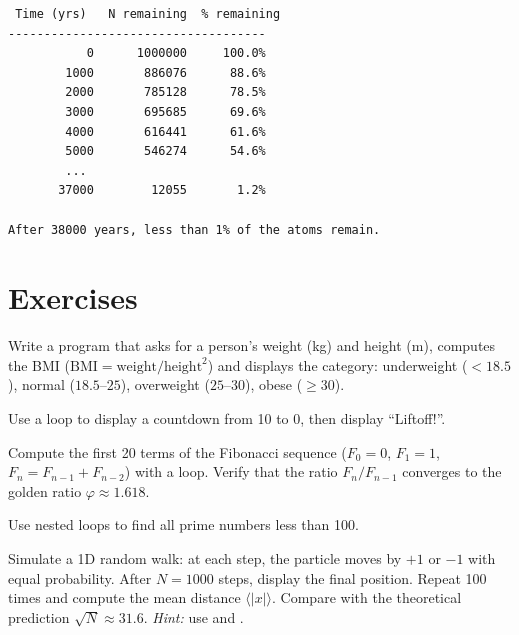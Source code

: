 \begin{codeoutput}
\begin{verbatim}
 Time (yrs)   N remaining  % remaining
------------------------------------
           0      1000000     100.0%
        1000       886076      88.6%
        2000       785128      78.5%
        3000       695685      69.6%
        4000       616441      61.6%
        5000       546274      54.6%
        ...
       37000        12055       1.2%

After 38000 years, less than 1% of the atoms remain.
\end{verbatim}
\end{codeoutput}

\section{Exercises}

\begin{exercise}
Write a program that asks for a person's weight (kg) and height (m),
computes the BMI ($\text{BMI} = \text{weight} / \text{height}^2$) and displays the
category: underweight ($<18.5$), normal ($18.5$--$25$), overweight ($25$--$30$),
obese ($\geq 30$).
\end{exercise}

\begin{exercise}
Use a  loop to display a countdown from 10 to 0,
then display ``Liftoff!''.
\end{exercise}

\begin{exercise}
Compute the first 20 terms of the Fibonacci sequence
($F_0 = 0$, $F_1 = 1$, $F_{n} = F_{n-1} + F_{n-2}$) with a  loop.
Verify that the ratio $F_n / F_{n-1}$ converges to the golden ratio
$\varphi \approx 1.618$.
\end{exercise}

\begin{exercise}
Use nested loops to find all prime numbers less than 100.
\end{exercise}

\begin{exercise}
Simulate a 1D random walk: at each step, the particle moves
by $+1$ or $-1$ with equal probability. After $N = 1000$ steps,
display the final position. Repeat 100 times and compute the mean
distance $\langle |x| \rangle$. Compare with the theoretical prediction
$\sqrt{N} \approx 31.6$.
\emph{Hint:} use  and .
\end{exercise}

